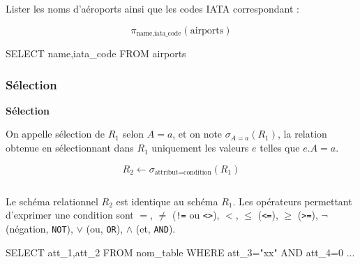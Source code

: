 \documentclass[10pt,fleqn]{article} %
\begin{document}
\begin{exemple}
Lister les noms d'aéroports ainsi que les codes IATA correspondant :

\ifprof
$$
\pi_{\text{name,iata\_code}}(\text{airports})
$$

\begin{envsql}
\begin{sql}
SELECT name,iata_code FROM airports
\end{sql}
\end{envsql}
\else

\vspace{3cm}

\fi
\end{exemple}

\subsubsection{Sélection}
\begin{defi}
\textbf{Sélection}

On appelle sélection de $R_1$ selon $A=a$, et on note $\sigma_{A=a}(R_1)$, la relation obtenue en sélectionnant dans $R_1$ uniquement les valeurs $e$ telles que $e.A = a$.
\ifprof

$$
R_2 \leftarrow \sigma_{\text{attribut}=\text{condition}}(R_1)
$$

\else
$$
\quad
$$
$$
\quad
$$
\fi

Le schéma relationnel $R_2$ est identique au schéma $R_1$.  Les opérateurs permettant d'exprimer une condition sont $=$, $\neq$ (\texttt{!=} ou \texttt{<>}), $<$, $\leq$ (\texttt{<=}), $\geq$ (\texttt{>=}), $\neg$ (négation, \texttt{NOT}), $\vee$ (ou, \texttt{OR}), $\wedge$ (et, \texttt{AND}).

\begin{envsql}
\begin{sql}
SELECT att_1,att_2 FROM nom_table WHERE att_3="xx" AND att_4=0 ...
\end{sql}
\end{envsql}

\end{defi}
\end{document}
